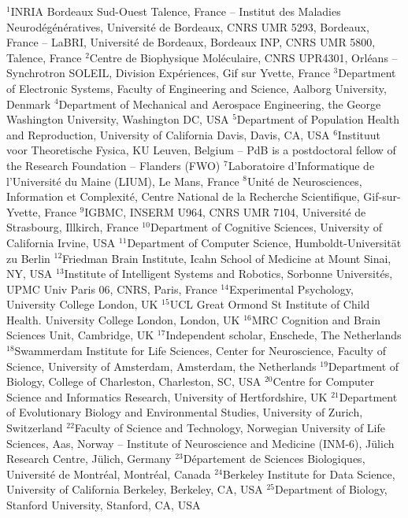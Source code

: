 $^{1}$INRIA Bordeaux Sud-Ouest Talence, France – Institut des Maladies Neurodégénératives, Université de Bordeaux, CNRS UMR 5293, Bordeaux, France – LaBRI, Université de Bordeaux, Bordeaux INP, CNRS UMR 5800, Talence, France
$^{2}$Centre de Biophysique Moléculaire, CNRS UPR4301, Orléans -- Synchrotron SOLEIL, Division Expériences, Gif sur Yvette, France
$^{3}$Department of Electronic Systems, Faculty of Engineering and Science, Aalborg University, Denmark
$^{4}$Department of Mechanical and Aerospace Engineering, the George Washington University, Washington DC, USA
$^{5}$Department of Population Health and Reproduction, University of California Davis, Davis, CA, USA
$^{6}$Instituut voor Theoretische Fysica, KU Leuven, Belgium -- PdB is a postdoctoral fellow of the Research Foundation -- Flanders (FWO)
$^{7}$Laboratoire d'Informatique de l'Université du Maine (LIUM), Le Mans, France
$^{8}$Unité de Neurosciences, Information et Complexité, Centre National de la Recherche Scientifique, Gif-sur-Yvette, France
$^{9}$IGBMC, INSERM U964, CNRS UMR 7104, Université de Strasbourg, Illkirch, France
$^{10}$Department of Cognitive Sciences, University of California Irvine, USA
$^{11}$Department of Computer Science, Humboldt-Universität zu Berlin
$^{12}$Friedman Brain Institute, Icahn School of Medicine at Mount Sinai, NY, USA
$^{13}$Institute of Intelligent Systems and Robotics, Sorbonne Universités, UPMC Univ Paris 06, CNRS, Paris, France
$^{14}$Experimental Psychology, University College London, UK
$^{15}$UCL Great Ormond St Institute of Child Health. University College London, London, UK
$^{16}$MRC Cognition and Brain Sciences Unit, Cambridge, UK
$^{17}$Independent scholar, Enschede, The Netherlands
$^{18}$Swammerdam Institute for Life Sciences, Center for Neuroscience, Faculty of Science, University of Amsterdam, Amsterdam, the Netherlands
$^{19}$Department of Biology, College of Charleston, Charleston, SC, USA
$^{20}$Centre for Computer Science and Informatics Research, University of Hertfordshire, UK
$^{21}$Department of Evolutionary Biology and Environmental Studies, University of Zurich, Switzerland
$^{22}$Faculty of Science and Technology, Norwegian University of Life Sciences, Aas, Norway -- Institute of Neuroscience and Medicine (INM-6), Jülich Research Centre, Jülich, Germany
$^{23}$Département de Sciences Biologiques, Université de Montréal, Montréal, Canada
$^{24}$Berkeley Institute for Data Science, University of California Berkeley, Berkeley, CA, USA
$^{25}$Department of Biology, Stanford University, Stanford, CA, USA
